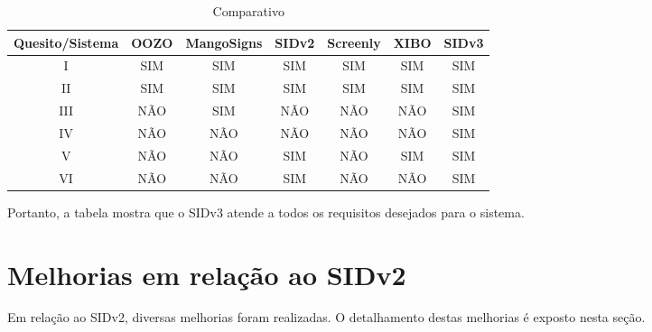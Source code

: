 \begin{table}[H]
	\caption{Comparativo}
	\label {tlb:comparativo2}
	\centering
	\begin{tabular}{|c|c|c|c|c|c|c|}
		\hline
		Quesito/Sistema & OOZO & MangoSigns & SIDv2 & Screenly & XIBO & SIDv3 \\ \hline
		I 				& SIM  & SIM		& SIM & SIM 	 & SIM	& SIM \\ \hline
		II 				& SIM  & SIM 		& SIM & SIM 	 & SIM		& SIM \\ \hline
		III				& NÃO  & SIM 		& NÃO & NÃO 	 & NÃO		& SIM \\ \hline
		IV 				& NÃO  & NÃO 		& NÃO & NÃO 	 & NÃO		& SIM \\ \hline
		V 				& NÃO  & NÃO 		& SIM & NÃO 	 & SIM		& SIM \\ \hline
		VI 				& NÃO  & NÃO 		& SIM & NÃO 	 & NÃO		& SIM \\ \hline
	\end{tabular}
\end{table}

Portanto, a tabela mostra que o SIDv3 atende a todos os requisitos desejados para o sistema.

\section{Melhorias em relação ao SIDv2}
Em relação ao SIDv2, diversas melhorias foram realizadas. O detalhamento destas melhorias é exposto nesta seção.

